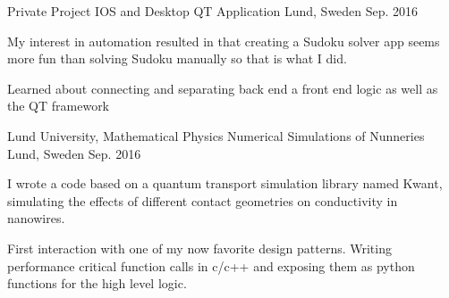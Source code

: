 \begin{cventries}
\cventry
{Private Project} %
{IOS and Desktop QT Application } %
{Lund, Sweden} %
{Sep. 2016 } %
{ %
\begin{cvitems}
\item {My interest in automation resulted in that creating a Sudoku solver app
seems more fun than solving Sudoku manually so that is what I did.}
\item {Learned about connecting and separating back end a front end logic
as well as the QT framework }
\end{cvitems}
}

\cventry
{Lund University, Mathematical Physics} %
{Numerical Simulations of Nunneries } %
{Lund, Sweden} %
{Sep. 2016 } %
{ %
\begin{cvitems}
\item {  I wrote a code based on a quantum transport simulation library named
Kwant, simulating the effects of different contact geometries on
conductivity in nanowires. }
\item {First interaction with one of my now favorite design patterns. Writing
performance critical function calls in c/c++ and exposing them as python
functions for the high level logic.}
\end{cvitems}
}


\end{cventries}
